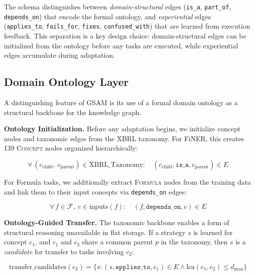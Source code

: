 \documentclass[12pt,a4paper]{article}
\begin{document}
The schema distinguishes between \textit{domain-structural} edges (\texttt{is\_a}, \texttt{part\_of}, \texttt{depends\_on}) that encode the formal ontology, and \textit{experiential} edges (\texttt{applies\_to}, \texttt{fails\_for}, \texttt{fixes}, \texttt{confused\_with}) that are learned from execution feedback. This separation is a key design choice: domain-structural edges can be initialized from the ontology before any tasks are executed, while experiential edges accumulate during adaptation.


\subsection{Domain Ontology Layer}
\label{sec:ontology}

A distinguishing feature of GSAM is its use of a formal domain ontology as a structural backbone for the knowledge graph.

\textbf{Ontology Initialization.} Before any adaptation begins, we initialize concept nodes and taxonomic edges from the XBRL taxonomy. For FiNER, this creates 139 \textsc{Concept} nodes organized hierarchically:

\begin{equation}
\forall\, (c_{\text{child}},\ c_{\text{parent}}) \in \text{XBRL\_Taxonomy}: \quad (c_{\text{child}}, \texttt{is\_a}, c_{\text{parent}}) \in E
\end{equation}

For Formula tasks, we additionally extract \textsc{Formula} nodes from the training data and link them to their input concepts via \texttt{depends\_on} edges:

\begin{equation}
\forall\, f \in \mathcal{F},\ c \in \text{inputs}(f): \quad (f, \texttt{depends\_on}, c) \in E
\end{equation}

\textbf{Ontology-Guided Transfer.} The taxonomic backbone enables a form of structural reasoning unavailable in flat storage. If a strategy $s$ is learned for concept $c_1$, and $c_1$ and $c_2$ share a common parent $p$ in the taxonomy, then $s$ is a \textit{candidate} for transfer to tasks involving $c_2$:

\begin{equation}
\text{transfer\_candidates}(c_2) = \{s : (s, \texttt{applies\_to}, c_1) \in E \land \text{lca}(c_1, c_2) \leq d_{\max}\}
\label{eq:transfer}
\end{equation}
\end{document}
